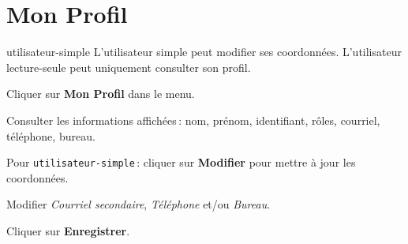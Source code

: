 \section{Mon Profil}

\begin{rolebox}{utilisateur-simple}
  L'utilisateur simple peut modifier ses coordonn\'ees. L'utilisateur lecture-seule peut uniquement consulter son profil.
\end{rolebox}

\begin{steps}
  \item Cliquer sur \textbf{Mon Profil} dans le menu.
  \item Consulter les informations affich\'ees\,: nom, pr\'enom, identifiant, r\^oles, courriel, t\'el\'ephone, bureau.
  \item Pour \texttt{utilisateur-simple}\,: cliquer sur \textbf{Modifier} pour mettre \`a jour les coordonn\'ees.
  \item Modifier \textit{Courriel secondaire}, \textit{T\'el\'ephone} et/ou \textit{Bureau}.
  \item Cliquer sur \textbf{Enregistrer}.
\end{steps}

